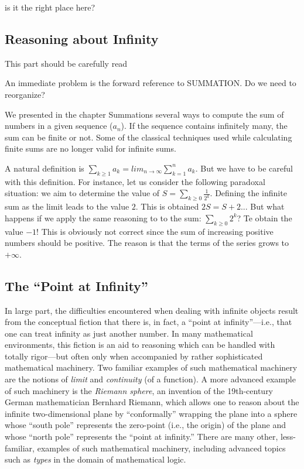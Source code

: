 {\Denis is it the right place here?}

\subsection{Reasoning about Infinity}

{\Denis This part should be carefully read}

{\Arny An immediate problem is the forward reference to SUMMATION.  Do
  we need to reorganize?}

We presented in the chapter Summations several ways to compute the sum
of numbers in a given sequence ($a_n$).  If the sequence contains
infinitely many, the sum can be finite or not.  Some of the classical
techniques used while calculating finite sums are no longer valid for
infinite sums.


A natural definition is $\sum_{k \geq 1} a_k = lim_{n \rightarrow \infty} \sum_{k=1}^{n} a_k$.
But we have to be careful with this definition. 
For instance, let us consider the following paradoxal situation:
we aim to determine the value of $S = \sum_{k \geq 0} \frac{1}{2^k}$.
Defining the infinite sum as the limit leads to the value $2$. 
This is obtained $2S = S+2$...
But what happens if we apply the same reasoning to to the sum: $\sum _{k \geq 0} 2^k$?
Te obtain the value $-1$!
This is obviously not correct since the sum of increasing positive numbers should be positive.
The reason is that the terms of the series grows to $+\infty$.


\subsection{The ``Point at Infinity''}
\label{sec:point-at-infinity}

In large part, the difficulties encountered when dealing with infinite
objects result from the conceptual fiction that there is, in fact, a
``point at infinity''---i.e., that one can treat infinity as just
another number.  In many mathematical environments, this fiction is an
aid to reasoning which can be handled with totally rigor---but often
only when accompanied by rather sophisticated mathematical machinery.
Two familiar examples of such mathematical machinery are the notions
of  {\it limit} and  {\it continuity}
(of a function).  A more advanced example of such machinery is the
{\it Riemann sphere},  an invention of the
19th-century German mathematician Bernhard Riemann,  which allows one to reason about the infinite
two-dimensional plane by ``conformally'' wrapping the plane into a
sphere whose ``south pole'' represents the zero-point (i.e., the
origin) of the plane and whose ``north pole'' represents the ``point
at infinity.''  There are many other, less-familiar, examples of such
mathematical machinery, including advanced topics such as {\it types}
in the domain of mathematical logic.

